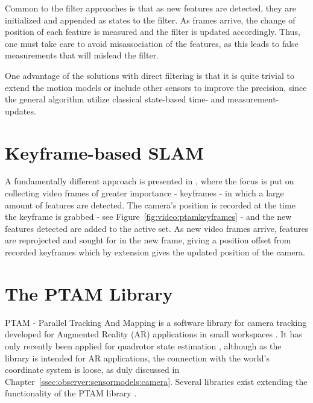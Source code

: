         Common to the filter approaches is that as new features are detected,
        they are initialized and appended as states to the filter.
        As frames arrive, the change of position of each feature is measured and
        the filter is updated accordingly.
        Thus, one must take care to avoid misassociation of the features, as
        this leads to false measurements that will mislead the filter.

        One advantage of the solutions with direct filtering is that it is quite
        trivial to extend the motion models or include other sensors to improve the precision, since
        the general algorithm utilize classical state-based time- and measurement-updates.

    \section{Keyframe-based SLAM}
        A fundamentally different approach is presented in \citep{klein07parallel},
        where the focus is put on collecting video frames of greater importance - keyframes -
        in which a large amount of features are detected.
        The camera's position is recorded at the time the keyframe is grabbed - see Figure~\ref{fig:video:ptamkeyframes} -
        and the new features detected are added to the active set.
        As new video frames arrive, features are reprojected and sought for in
        the new frame, giving a position offset from recorded keyframes which by
        extension gives the updated position of the camera.


    \section{The PTAM Library}
        PTAM - Parallel Tracking And Mapping is a software library for camera tracking
        developed for Augmented Reality (AR) applications in small workspaces \citep{klein07parallel}.
        It has only recently been applied for quadrotor state estimation \citep{weiss11monocular},
        although as the library is intended for AR applications, the connection
        with the world's coordinate system is loose, as duly discussed in Chapter~\ref{ssec:observer:sensormodels:camera}.
        Several libraries exist extending the functionality of the PTAM library \citep{Nguyen_Sandor_Park_2010}.


